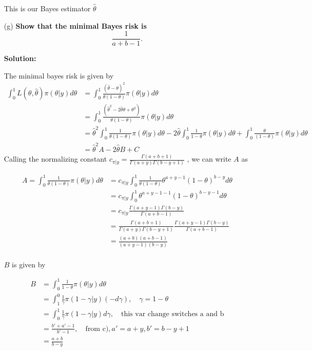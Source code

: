 \documentclass{article}
\begin{document}
\begin{enumerate}
    This is our Bayes estimator $\hat \theta$


    
    
    \item[(g)] \textbf{Show that the minimal Bayes risk is}
    \[\frac{1}{a + b - 1}.\]
    
    \textbf{Solution:}
    \par
    The minimal bayes risk is given by 
    \begin{align*}
        \int_{0}^{1} L(\theta, \hat{\theta}) \pi(\theta | y) d\theta &= \int_{0}^{1} \frac{(\hat{\theta} - \theta)^2}{\theta(1-\theta)} \pi(\theta | y) d\theta\\
        &= \int_{0}^{1} \frac{\left(\hat{\theta}^2 -2\hat{\theta} \theta + \theta^2 \right)}{\theta(1-\theta)} \pi(\theta | y) d\theta\\
        &= \hat{\theta}^2 \int_0^1 \frac{1}{\theta(1-\theta)} \pi(\theta | y) d\theta - 2\hat{\theta} \int_0^1 \frac{1}{1-\theta}\pi(\theta | y) d\theta + \int_0^1 \frac{\theta}{(1-\theta)} \pi(\theta | y) d\theta\\
        &= \hat{\theta}^2 A -2 \hat{\theta} B + C       
    \end{align*}
Calling the normalizing constant $c_{\pi | y} = \frac{\Gamma(a+b+1)}{\Gamma(a+y) \Gamma(b-y+1)}$ , we can write $A$ as

\begin{align*}
    A =  \int_0^1 \frac{1}{\theta(1-\theta)} \pi(\theta | y) d\theta &=  c_{\pi | y} \int_0^1 \frac{1}{\theta(1-\theta)} \theta^{a + y -1} (1-\theta)^{b-y} d\theta\\
    &=  c_{\pi | y} \int_0^1 \theta^{a+y-1-1} (1-\theta)^{b-y-1} d\theta\\
    &=  c_{\pi | y} \frac{\Gamma(a+y-1) \Gamma(b-y)}{\Gamma(a+b-1)}\\
    &=  \frac{\Gamma(a+b+1)}{\Gamma(a+y) \Gamma(b-y+1)} \frac{\Gamma(a+y-1) \Gamma(b-y)}{\Gamma(a+b-1)}\\
    &= \frac{(a+b)(a+b-1)}{(a+y-1)(b-y)}\\
\end{align*}

$B$ is given by

\begin{align*}
    B &= \int_0^1 \frac{1}{1-\theta} \pi(\theta | y) d\theta\\
    &= \int_1^0 \frac{1}{\gamma} \pi(1-\gamma | y) (-d\gamma), \quad \gamma = 1-\theta\\
    &= \int_0^1 \frac{1}{\gamma} \pi(1-\gamma | y) d\gamma, \quad \text{this var change switches a and b}\\
    &= \frac{b'+a'-1}{b'-1}, \quad \text{from c)}, a' = a + y, b' = b - y + 1 \\
    &= \frac{a+b}{b-y}
\end{align*}


\end{enumerate}
\end{document}
